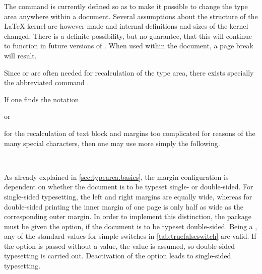\begin{Explain}
  The command  is currently defined so as to make it
  possible to change the type area anywhere within a
  document. Several assumptions about the structure of the {\LaTeX}
  kernel are however made and internal definitions and sizes of the
  kernel changed. There is a definite possibility, but no guarantee,
  that this will continue to function in future versions of
  \LaTeXe{}. When used within the document, a page break will result.
\end{Explain}

Since  or
 are often needed for
recalculation of the type area, there exists specially the
abbreviated command
.

\begin{Example}
  If one finds the notation
\begin{lstcode}
\end{lstcode}
  or
\begin{lstcode}
\end{lstcode}
  for the recalculation of text block and margins too complicated for
  reasons of the many special characters, then one may use more simply
  the following.
\begin{lstcode}
  \recalctypearea
\end{lstcode}
\end{Example}%
%

%
%
\begin{Declaration}
  \\
\end{Declaration}%
As already explained in \autoref{sec:typearea.basics}, the margin
configuration is dependent on whether the document is to be typeset
single- or double-sided. For single-sided typesetting, the left and
right margins are equally wide, whereas for double-sided printing the
inner margin of one page is only half as wide as the corresponding
outer margin. In order to implement this distinction, the
 package must be given the  option,
if the document is to be typeset double-sided. Being a ,
any of the standard values for simple switches in
\autoref{tab:truefalseswitch} are valid. If the option is passed
without a value, the value  is assumed, so double-sided
typesetting is carried out. Deactivation of the option leads to
single-sided typesetting.

